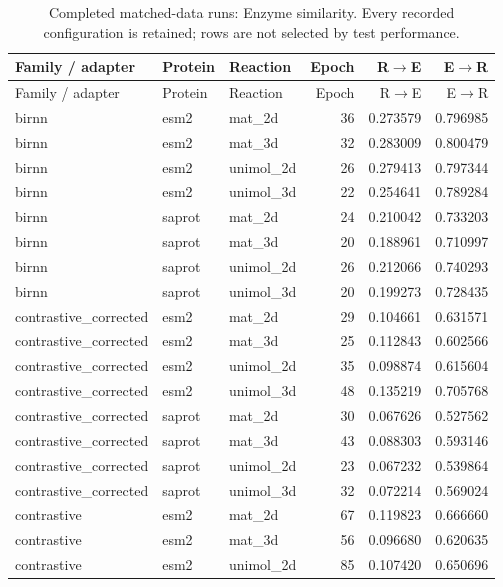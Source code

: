 \begin{longtable}{p{.32\linewidth}llrrr}
\caption{Completed matched-data runs: Enzyme similarity. Every recorded configuration is retained; rows are not selected by test performance.}\label{tab:exp-all-enzyme-smi}\\
\toprule
Family / adapter & Protein & Reaction & Epoch & R$\to$E & E$\to$R \\
\midrule\endfirsthead
\toprule
Family / adapter & Protein & Reaction & Epoch & R$\to$E & E$\to$R \\
\midrule\endhead
\bottomrule\endfoot
birnn & esm2 & mat\_2d & 36 & 0.273579 & 0.796985 \\
birnn & esm2 & mat\_3d & 32 & 0.283009 & 0.800479 \\
birnn & esm2 & unimol\_2d & 26 & 0.279413 & 0.797344 \\
birnn & esm2 & unimol\_3d & 22 & 0.254641 & 0.789284 \\
birnn & saprot & mat\_2d & 24 & 0.210042 & 0.733203 \\
birnn & saprot & mat\_3d & 20 & 0.188961 & 0.710997 \\
birnn & saprot & unimol\_2d & 26 & 0.212066 & 0.740293 \\
birnn & saprot & unimol\_3d & 20 & 0.199273 & 0.728435 \\
contrastive\_corrected & esm2 & mat\_2d & 29 & 0.104661 & 0.631571 \\
contrastive\_corrected & esm2 & mat\_3d & 25 & 0.112843 & 0.602566 \\
contrastive\_corrected & esm2 & unimol\_2d & 35 & 0.098874 & 0.615604 \\
contrastive\_corrected & esm2 & unimol\_3d & 48 & 0.135219 & 0.705768 \\
contrastive\_corrected & saprot & mat\_2d & 30 & 0.067626 & 0.527562 \\
contrastive\_corrected & saprot & mat\_3d & 43 & 0.088303 & 0.593146 \\
contrastive\_corrected & saprot & unimol\_2d & 23 & 0.067232 & 0.539864 \\
contrastive\_corrected & saprot & unimol\_3d & 32 & 0.072214 & 0.569024 \\
contrastive & esm2 & mat\_2d & 67 & 0.119823 & 0.666660 \\
contrastive & esm2 & mat\_3d & 56 & 0.096680 & 0.620635 \\
contrastive & esm2 & unimol\_2d & 85 & 0.107420 & 0.650696 \\

\end{longtable}
